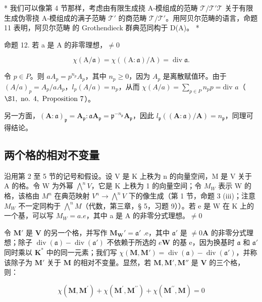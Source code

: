 * 我们可以像第 4 节那样，考虑由有限生成挠 A-模组成的范畴 \(\mathcal{T} / \mathcal{T}'\)\(\mathcal{T}\) 关于有限生成伪零挠 A-模组成的满子范畴 \(\mathcal{T}'\) 的商范畴 \(\mathcal{T} / \mathcal{T}'\)。用阿贝尔范畴的语言，命题 11 表明，阿贝尔范畴  的 Grothendieck 群典范同构于 D(A)。 *

命题 12. 若 a 是 A 的非零理想，\(\neq 0\)

\[
\chi (\mathrm{A} / \mathfrak {a}) = \chi ((\mathrm{A}: \mathfrak {a}) / \mathrm{A}) = \operatorname{div} \mathfrak {a}.
\]

令 \(p \in P\)。则 \(aA_p = p^{n_p}A_p\)，其中 \(n_p \geqslant 0\)，因为 \(A_p\) 是离散赋值环。由于 \((A/a)_p = A_p/aA_p\)，\(l_p(A/a) = n_p\)，从而 \(\chi(A/a) = \sum_{p \in P} n_p p = \text{div } a\)（\(\S 1, \text{ no. } 4, \text{ Proposition } 7\)）。

另一方面，\((\mathbf{A}:\mathfrak{a})_{\mathfrak{p}} = \mathbf{A}_{\mathfrak{p}}\colon \mathfrak{a}\mathbf{A}_{\mathfrak{p}} = \mathfrak{p}^{-n_{\mathfrak{p}}}\mathbf{A}_{\mathfrak{p}}\)，因此 \(l_{\mathfrak{p}}((\mathbf{A}:\mathfrak{a}) / \mathbf{A}) = n_{\mathfrak{p}}\)，同理可得结论。

\subsection{两个格的相对不变量}

沿用第 2 至 5 节的记号和假设。设 V 是 K 上秩为 n 的向量空间，M 是 V 关于 A 的格。令 W 为外幂 \(\bigwedge^{n}V\)，它是 K 上秩为 1 的向量空间；令 \(M_{W}\) 表示 W 的格，该格由 \(M^{n}\) 在典范映射 \(V^{n}\to\bigwedge^{n}V\) 下的像生成（第 1 节，命题 3 (iii)；注意 \(M_{W}\) 不一定同构于 \(\bigwedge^{n}M\)（代数，第三章，§ 5，习题 9））。若 e 是 W 在 K 上的一个基，可以写 \(M_{W}=a.e\)，其中 a 是 A 的非零分式理想。\(\neq0\)

令 \(\mathbf{M}'\) 是 \(\mathbf{V}\) 的另一个格，并写作 \(\mathbf{M}_{\mathbf{W}}' = \mathfrak{a}'\) .e，其中 \(\mathfrak{a}'\) 是 \(\neq 0\)\(\mathbf{A}\) 的非零分式理想；除子 \(\operatorname{div}(\mathfrak{a}) - \operatorname{div}(\mathfrak{a}')\) 不依赖于所选的 \(e\)\(\mathbf{W}\) 的基 e，因为换基时 \(\mathfrak{a}\) 和 \(\mathfrak{a}'\) 同时乘以 \(\mathbf{K}^*\) 中的同一元素；我们写 \(\chi(\mathbf{M}, \mathbf{M}') = \operatorname{div}(\mathfrak{a}) - \operatorname{div}(\mathfrak{a}')\)，并称该除子为 \(\mathbf{M}'\) 关于 \(\mathbf{M}\) 的相对不变量。显然，若 \(\mathbf{M}, \mathbf{M}', \mathbf{M}''\) 是 \(\mathbf{V}\) 的三个格，则：

\[
\chi (\mathbf {M}, \mathbf {M} ^ {\prime}) + \chi (\mathbf {M} ^ {\prime}, \mathbf {M} ^ {\prime \prime}) + \chi (\mathbf {M} ^ {\prime \prime}, \mathbf {M}) = 0\tag{3}
\]

